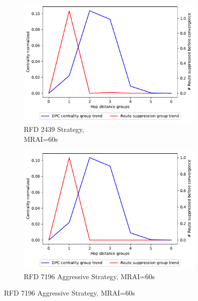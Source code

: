 \begin{figure}[H]
\begin{subfigure}[b]{0.325\textwidth}
         \label{fig:1000_7196RFDC_centVSsup_elephants}
     \end{subfigure}
     \vfill
     \begin{subfigure}[b]{0.325\textwidth}
         \centering
         \includegraphics[width=\textwidth]{images/RFD/miceVSelephants/MultiMRAI/60/elephants/cisco_1000_RFD_nodeConvergence_centVSsup_trend.pdf}
         \caption{RFD 2439 Strategy, \\MRAI=60s}
         \label{fig:1000_2439RFD_centVSsup_elephants}
     \end{subfigure}
     \hfill
     \begin{subfigure}[b]{0.325\textwidth}
         \centering
         \includegraphics[width=\textwidth]{images/RFD/miceVSelephants/MultiMRAI/60/elephants/cisco_1000_RFD_7196_aggressive_nodeConvergence_centVSsup_trend.pdf}
         \caption{RFD 7196 Aggressive Strategy, MRAI=60s}

\end{subfigure}
\end{figure}
